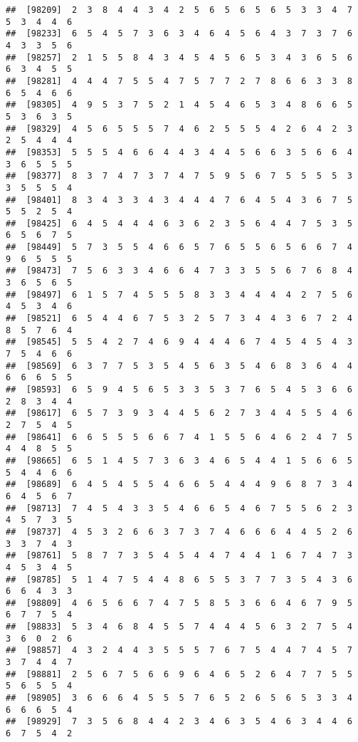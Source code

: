 \documentclass[
]{book}
\begin{document}
\begin{verbatim}
##  [98209]  2  3  8  4  4  3  4  2  5  6  5  6  5  6  5  3  3  4  7  5  3  4  4  6
##  [98233]  6  5  4  5  7  3  6  3  4  6  4  5  6  4  3  7  3  7  6  4  3  3  5  6
##  [98257]  2  1  5  5  8  4  3  4  5  4  5  6  5  3  4  3  6  5  6  6  3  4  5  5
##  [98281]  4  4  4  7  5  5  4  7  5  7  7  2  7  8  6  6  3  3  8  6  5  4  6  6
##  [98305]  4  9  5  3  7  5  2  1  4  5  4  6  5  3  4  8  6  6  5  5  3  6  3  5
##  [98329]  4  5  6  5  5  5  7  4  6  2  5  5  5  4  2  6  4  2  3  2  5  4  4  4
##  [98353]  5  5  5  4  6  6  4  4  3  4  4  5  6  6  3  5  6  6  4  3  6  5  5  5
##  [98377]  8  3  7  4  7  3  7  4  7  5  9  5  6  7  5  5  5  5  3  3  5  5  5  4
##  [98401]  8  3  4  3  3  4  3  4  4  4  7  6  4  5  4  3  6  7  5  5  5  2  5  4
##  [98425]  6  4  5  4  4  4  6  3  6  2  3  5  6  4  4  7  5  3  5  6  5  6  7  5
##  [98449]  5  7  3  5  5  4  6  6  5  7  6  5  5  6  5  6  6  7  4  9  6  5  5  5
##  [98473]  7  5  6  3  3  4  6  6  4  7  3  3  5  5  6  7  6  8  4  3  6  5  6  5
##  [98497]  6  1  5  7  4  5  5  5  8  3  3  4  4  4  4  2  7  5  6  4  5  3  4  6
##  [98521]  6  5  4  4  6  7  5  3  2  5  7  3  4  4  3  6  7  2  4  8  5  7  6  4
##  [98545]  5  5  4  2  7  4  6  9  4  4  4  6  7  4  5  4  5  4  3  7  5  4  6  6
##  [98569]  6  3  7  7  5  3  5  4  5  6  3  5  4  6  8  3  6  4  4  6  6  6  5  5
##  [98593]  6  5  9  4  5  6  5  3  3  5  3  7  6  5  4  5  3  6  6  2  8  3  4  4
##  [98617]  6  5  7  3  9  3  4  4  5  6  2  7  3  4  4  5  5  4  6  2  7  5  4  5
##  [98641]  6  6  5  5  5  6  6  7  4  1  5  5  6  4  6  2  4  7  5  4  4  8  5  5
##  [98665]  6  5  1  4  5  7  3  6  3  4  6  5  4  4  1  5  6  6  5  5  4  4  6  6
##  [98689]  6  4  5  4  5  5  4  6  6  5  4  4  4  9  6  8  7  3  4  6  4  5  6  7
##  [98713]  7  4  5  4  3  3  5  4  6  6  5  4  6  7  5  5  6  2  3  4  5  7  3  5
##  [98737]  4  5  3  2  6  6  3  7  3  7  4  6  6  6  4  4  5  2  6  3  3  7  4  3
##  [98761]  5  8  7  7  3  5  4  5  4  4  7  4  4  1  6  7  4  7  3  4  5  3  4  5
##  [98785]  5  1  4  7  5  4  4  8  6  5  5  3  7  7  3  5  4  3  6  6  6  4  3  3
##  [98809]  4  6  5  6  6  7  4  7  5  8  5  3  6  6  4  6  7  9  5  6  7  7  5  4
##  [98833]  5  3  4  6  8  4  5  5  7  4  4  4  5  6  3  2  7  5  4  3  6  0  2  6
##  [98857]  4  3  2  4  4  3  5  5  5  7  6  7  5  4  4  7  4  5  7  3  7  4  4  7
##  [98881]  2  5  6  7  5  6  6  9  6  4  6  5  2  6  4  7  7  5  5  5  6  5  5  4
##  [98905]  3  6  6  6  4  5  5  5  7  6  5  2  6  5  6  5  3  3  4  6  6  6  5  4
##  [98929]  7  3  5  6  8  4  4  2  3  4  6  3  5  4  6  3  4  4  6  6  7  5  4  2

\end{verbatim}
\end{document}
